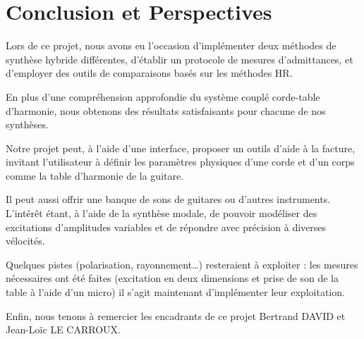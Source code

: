 \chapter*{Conclusion et Perspectives}
Lors de ce projet, nous avons eu l'occasion d'implémenter deux méthodes de synthèse hybride différentes, d'établir un protocole de mesures d'admittances, et d'employer des outils de comparaisons basés sur les méthodes HR.

En plus d'une compréhension approfondie du système couplé corde-table d'harmonie, nous obtenons des résultats satisfaisants pour chacune de nos synthèses.

Notre projet peut, à l'aide d'une interface, proposer un outils d'aide à la facture, invitant l'utilisateur à définir les paramètres physiques d'une corde et d'un corps comme la table d'harmonie de la guitare.

Il peut aussi offrir une banque de sons de guitares ou d'autres instruments. L'intérêt étant, à l'aide de la synthèse modale, de pouvoir modéliser des excitations d'amplitudes variables et de répondre avec précision à diverses vélocités.

Quelques pistes (polarisation, rayonnement\dots) resteraient à exploiter : les mesures nécessaires ont été faites (excitation en deux dimensions et prise de son de la table à l'aide d'un micro) il s'agit maintenant d'implémenter leur exploitation. 

Enfin, nous tenons à remercier les encadrants de ce projet Bertrand DAVID et Jean-Loïc LE CARROUX.